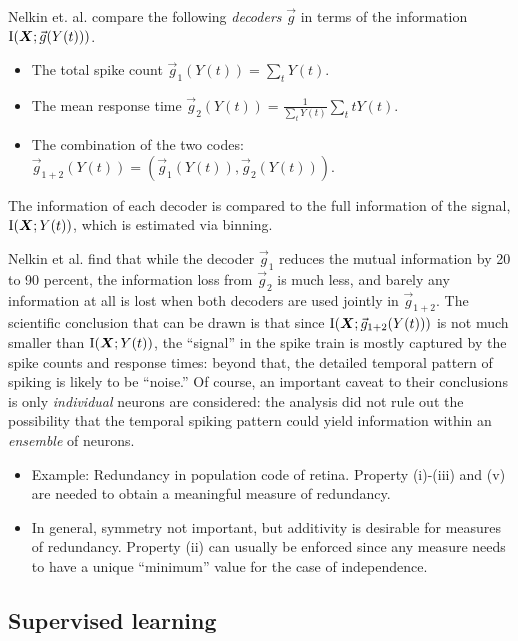\documentclass[12pt]{article}
\begin{document}
Nelkin et. al. compare the following \emph{decoders} $\vec{g}$ in terms
of the information $\text{I}(\boldsymbol{X}; \vec{g}(Y(t)))$.
\begin{itemize}
\item The total spike count $\vec{g}_1(Y(t)) = \sum_t Y(t)$.
\item The mean response time $\vec{g}_2(Y(t)) = \frac{1}{\sum_t Y(t)} \sum_t t Y(t)$.
\item The combination of the two codes: $\vec{g}_{1+2}(Y(t)) = (\vec{g}_1(Y(t)), \vec{g}_2(Y(t)))$.
\end{itemize}
The information of each decoder is compared to the full information of
the signal, $\text{I}(\boldsymbol{X}; Y(t))$, which is estimated via binning.

Nelkin et al. find that while the decoder $\vec{g}_1$ reduces the
mutual information by 20 to 90 percent, the information loss from
$\vec{g}_2$ is much less, and barely any information at all is lost
when both decoders are used jointly in $\vec{g}_{1+2}$.  The
scientific conclusion that can be drawn is that since
$\text{I}(\boldsymbol{X}; \vec{g}_{1+2}(Y(t)))$ is not much smaller than
$\text{I}(\boldsymbol{X}; Y(t))$, the ``signal'' in the spike train is mostly
captured by the spike counts and response times: beyond that, the
detailed temporal pattern of spiking is likely to be ``noise.''  Of
course, an important caveat to their conclusions is
only \emph{individual} neurons are considered: the analysis did not
rule out the possibility that the temporal spiking pattern could yield
information within an \emph{ensemble} of neurons.


\begin{itemize}
\item Example: Redundancy in population code of retina.  
Property (i)-(iii) and (v) are needed to obtain a meaningful measure
of redundancy.
\item In general, symmetry not important, but additivity is desirable 
for measures of redundancy.  Property (ii) can usually be enforced
since any measure needs to have a unique ``minimum'' value for the
case of independence.
\end{itemize}

\subsection{Supervised learning}\label{sec:background_sl}
\end{document}
